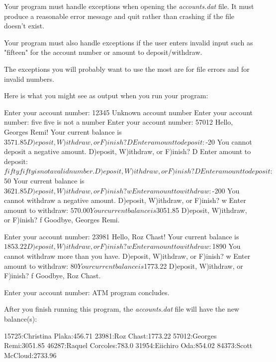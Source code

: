 \begin{exercise}
Your program must handle exceptions when opening the {\em accounts.dat} file. It must produce a reasonable error message and quit rather than crashing if the file doesn't exist.

Your program must also handle exceptions if the user enters invalid input such as "fifteen" for the account number or amount to deposit/withdraw.

The exceptions you will probably want to use the most are  for file errors and  for invalid numbers.

Here is what you might see as output when you run your program:

\begin{stdout}
Enter your account number: 12345
Unknown account number
Enter your account number: five
five is not a number
Enter your account number: 57012
Hello, Georges Remi!
Your current balance is $3571.85
D)eposit, W)ithdraw, or F)inish? D
Enter amount to deposit: $-20
You cannot deposit a negative amount.
D)eposit, W)ithdraw, or F)inish? D
Enter amount to deposit: $fifty
fifty is not a valid number.
D)eposit, W)ithdraw, or F)inish? D
Enter amount to deposit: $50
Your current balance is $3621.85
D)eposit, W)ithdraw, or F)inish? w
Enter amount to withdraw: $-200
You cannot withdraw a negative amount.
D)eposit, W)ithdraw, or F)inish? w
Enter amount to withdraw: $570.00
Your current balance is $3051.85
D)eposit, W)ithdraw, or F)inish? f
Goodbye, Georges Remi.

Enter your account number: 23981
Hello, Roz Chast!
Your current balance is $1853.22
D)eposit, W)ithdraw, or F)inish? w
Enter amount to withdraw: $1890
You cannot withdraw more than you have.
D)eposit, W)ithdraw, or F)inish? w
Enter amount to withdraw: $80
Your current balance is $1773.22
D)eposit, W)ithdraw, or F)inish? f
Goodbye, Roz Chast.

Enter your account number:
ATM program concludes.
\end{stdout}

After you finish running this program, the {\em accounts.dat} file will have the new balance(s):

\begin{stdout}
15725:Christina Plaka:456.71
23981:Roz Chast:1773.22
57012:Georges Remi:3051.85
46287:Raquel Corcoles:783.0
31954:Eiichiro Oda:854.02
84373:Scott McCloud:2733.96
\end{stdout}

\end{exercise}
